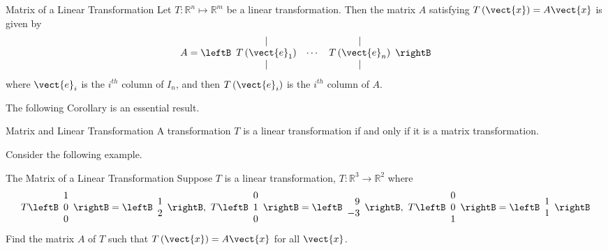 \begin{theorem}{Matrix of a Linear Transformation}\label{thm:matrixoflineartransformation}
Let $T: \mathbb{R}^{n} \mapsto \mathbb{R}^{m}$ be a linear transformation. Then the matrix $A$ satisfying $T\left(\vect{x}\right)=A\vect{x}$ is given by
\begin{equation*}
A=
\leftB
\begin{array}{ccc}
| &  & | \\
T\left( \vect{e}_{1}\right) & \cdots & T\left( \vect{e}_{n}\right) \\
| &  & |
\end{array}
\rightB
\end{equation*}
where $\vect{e}_{i}$ is the $i^{th}$ column of $I_n$, and then $T\left( \vect{e}_{i}
\right)$ is the $i^{th}$ column of $A.$
\end{theorem}

The following Corollary is an essential result.

\begin{corollary}{Matrix and Linear Transformation}\label{cor:matrixlintransfequivalence}
A transformation $T$ is a linear transformation if and only if it is a matrix transformation. 
\end{corollary}

Consider the following example.

\begin{example}{The Matrix of a Linear Transformation}\label{exa:matrixoflineartransformation}
Suppose $T$ is a linear transformation, $T:\mathbb{R}^{3}\rightarrow \mathbb{
R}^{2}$ where 
\begin{equation*}
T\leftB
\begin{array}{r}
1 \\
0 \\
0
\end{array}
\rightB =\leftB
\begin{array}{r}
1 \\
2
\end{array}
\rightB ,\ T\leftB
\begin{array}{r}
0 \\
1 \\
0
\end{array}
\rightB =\leftB
\begin{array}{r}
9 \\
-3
\end{array}
\rightB ,\ T\leftB
\begin{array}{r}
0 \\
0 \\
1
\end{array}
\rightB =\leftB
\begin{array}{r}
1 \\
1
\end{array}
\rightB
\end{equation*}
Find the matrix $A$ of $T$ such that $T \left( \vect{x} \right)=A\vect{x}$  for all $\vect{x}$.
\end{example}

